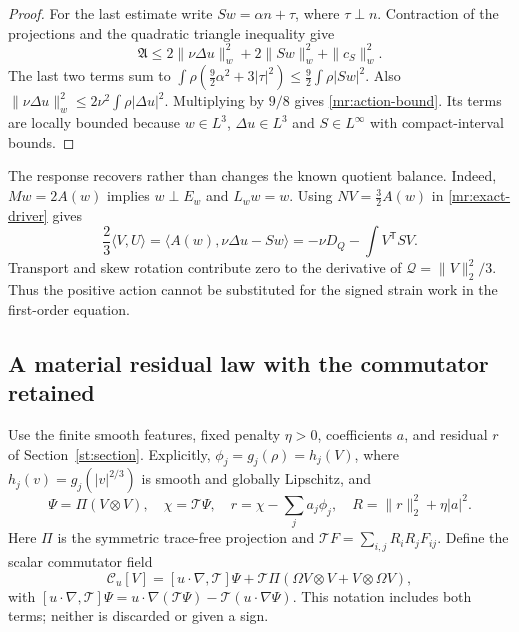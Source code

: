\begin{proof}
For the last estimate write $Sw=\alpha n+\tau$, where $\tau\perp n$.
Contraction of the projections and the quadratic triangle inequality give
\[
 \mathfrak A\le2\|\nu\Delta u\|_w^2
                    +2\|Sw\|_w^2+\|c_S\|_w^2.
\]
The last two terms sum to
$\int\rho(\frac92\alpha^2+3|\tau|^2)
\le\frac92\int\rho|Sw|^2$.
Also $\|\nu\Delta u\|_w^2\le2\nu^2\int\rho|\Delta u|^2$.
Multiplying by $9/8$ gives \eqref{mr:action-bound}.
Its terms are locally bounded because $w\in L^3$, $\Delta u\in L^3$
and $S\in L^\infty$ with compact-interval bounds.
\end{proof}

\begin{remark}\label{mr:balance}
The response recovers rather than changes the known quotient balance.
Indeed, $Mw=2A(w)$ implies $w\perp E_w$ and $L_ww=w$. Using
$N V=\frac32 A(w)$ in \eqref{mr:exact-driver} gives
\[
 \frac23\langle V,U\rangle
   =\langle A(w),\nu\Delta u-Sw\rangle
   =-\nu D_Q-\int V^{\mathsf T}SV.
\]
Transport and skew rotation contribute zero to the derivative of
$\mathcal Q=\|V\|_2^2/3$. Thus the positive action cannot be substituted
for the signed strain work in the first-order equation.
\end{remark}

\subsection{A material residual law with the commutator retained}

Use the finite smooth features, fixed penalty $\eta>0$, coefficients $a$,
and residual $r$ of Section~\ref{st:section}. Explicitly,
$\phi_j=g_j(\rho)=h_j(V)$, where
$h_j(v)=g_j(|v|^{2/3})$ is smooth and globally Lipschitz, and
\[
 \Psi=\Pi(V\otimes V),\quad \chi=\mathcal T\Psi,\quad
 r=\chi-\sum_j a_j\phi_j,\quad
 R=\|r\|_2^2+\eta|a|^2.
\]
Here $\Pi$ is the symmetric trace-free projection and
$\mathcal T F=\sum_{i,j}R_iR_jF_{ij}$.
Define the scalar commutator field
\begin{equation}\label{mr:commutator}
 \mathcal C_u[V]=[u\cdot\nabla,\mathcal T]\Psi
   +\mathcal T\Pi(\Omega V\otimes V+V\otimes\Omega V),
\end{equation}
with $[u\cdot\nabla,\mathcal T]\Psi
=u\cdot\nabla(\mathcal T\Psi)-\mathcal T(u\cdot\nabla\Psi)$.
This notation includes both terms; neither is discarded or given a sign.

